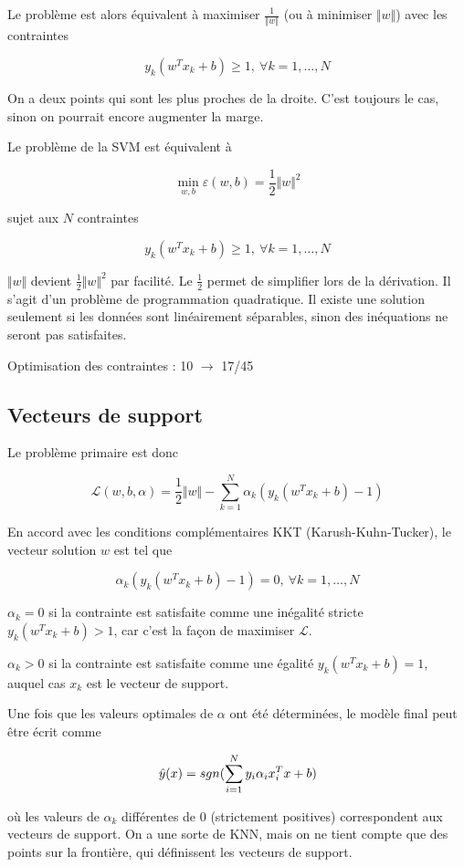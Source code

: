 	Le problème est alors équivalent à maximiser $\frac{1}{\Vert w \Vert}$ (ou à minimiser $\Vert w \Vert$) avec les contraintes
	
	$$y_k(w^T x_k + b) \geq 1, \: \forall k = 1, \dots , N$$
	
	On a deux points qui sont les plus proches de la droite. C'est toujours le cas, sinon on pourrait encore augmenter la marge.
	
	Le problème de la SVM est équivalent à
	
	$$\min_{w, b} \varepsilon(w, b) = \frac{1}{2} \Vert w \Vert^2$$
	
	sujet aux $N$ contraintes
	
	$$y_k(w^T x_k + b) \geq 1, \: \forall k = 1, \dots , N$$

	$\Vert w \Vert$ devient $\frac{1}{2} \Vert w \Vert^2$ par facilité. Le $\frac{1}{2}$ permet de simplifier lors de la dérivation. Il s'agit d'un problème de programmation quadratique. Il existe une solution seulement si les données sont linéairement séparables, sinon des inéquations ne seront pas satisfaites.
	
	Optimisation des contraintes : 10 $\rightarrow$ 17/45
	
	\subsection{Vecteurs de support}
	
	Le problème primaire est donc
	
	$$\mathcal{L}(w, b, \alpha) = \frac{1}{2} \Vert w \Vert - \sum_{k = 1}^N \alpha_k (y_k (w^Tx_k + b) - 1)$$
	
	En accord avec les conditions complémentaires KKT (Karush-Kuhn-Tucker), le vecteur solution $w$ est tel que
	
	$$\alpha_k (y_k (w^T x_k + b) - 1) = 0, \: \forall k = 1, \dots , N$$
	
	$\alpha_k = 0$ si la contrainte est satisfaite comme une inégalité stricte $y_k (w^T x_k + b) > 1$, car c'est la façon de maximiser $\mathcal{L}$.
	
	$\alpha_k > 0$ si la contrainte est satisfaite comme une égalité $y_k(w^Tx_k + b) = 1$, auquel cas $x_k$ est le vecteur de support.
	
	Une fois que les valeurs optimales de $\alpha$ ont été déterminées, le modèle final peut être écrit comme
	
	$$\hat{y}(x) = sgn(\sum_{i= 1}^N y_i \alpha_i x_i^T x + b)$$
	
	où les valeurs de $\alpha_k$ différentes de 0 (strictement positives) correspondent aux vecteurs de support. On a une sorte de KNN, mais on ne tient compte que des points sur la frontière, qui définissent les vecteurs de support.
	
